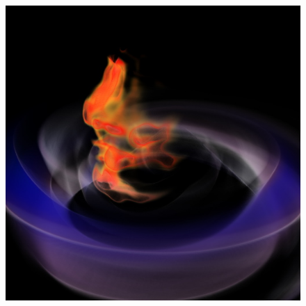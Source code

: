 \documentclass{egpubl}
\newlength{\boxheight}
\begin{document}
\begin{figure}[p]
\begin{minipage}[b][\boxheight][b]{0.24\linewidth}
\begin{minipage}[t]{0.98\linewidth}
    \end{minipage}%
    \vfill%
    \begin{minipage}[b]{0.98\linewidth}
      \centering
      \includegraphics[width=\textwidth]{snapshots/space/space-only-vols.jpg}
    \end{minipage}%
  \end{minipage}%
  \hfill%
  \usebox\savedProteinBox
  \hfill%
  \begin{minipage}[b][\boxheight][b]{0.24\linewidth}
    \centering%
    \begin{minipage}[t]{0.98\linewidth}
      \centering

\end{minipage}
\end{minipage}
\end{figure}
\end{document}
